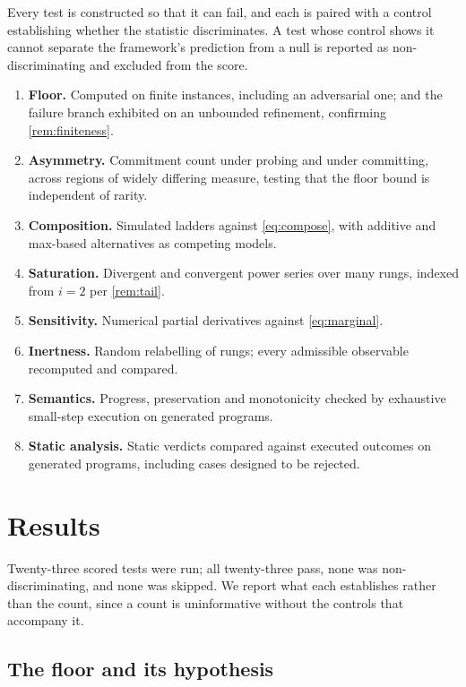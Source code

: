 \documentclass[11pt,twocolumn,a4paper]{article}
\theoremstyle{plain}
\theoremstyle{definition}
\theoremstyle{remark}
\begin{document}
Every test is constructed so that it can fail, and each is paired with a control
establishing whether the statistic discriminates. A test whose control shows it
cannot separate the framework's prediction from a null is reported as
non-discriminating and excluded from the score.

\begin{enumerate}[label=\textbf{V\arabic*.},leftmargin=3em,itemsep=0.4em]
\item \textbf{Floor.} Computed on finite instances, including an adversarial
one; and the failure branch exhibited on an unbounded refinement, confirming
\cref{rem:finiteness}.
\item \textbf{Asymmetry.} Commitment count under probing and under committing,
across regions of widely differing measure, testing that the floor bound is
independent of rarity.
\item \textbf{Composition.} Simulated ladders against \cref{eq:compose}, with
additive and max-based alternatives as competing models.
\item \textbf{Saturation.} Divergent and convergent power series over many
rungs, indexed from $i=2$ per \cref{rem:tail}.
\item \textbf{Sensitivity.} Numerical partial derivatives against
\cref{eq:marginal}.
\item \textbf{Inertness.} Random relabelling of rungs; every admissible
observable recomputed and compared.
\item \textbf{Semantics.} Progress, preservation and monotonicity checked by
exhaustive small-step execution on generated programs.
\item \textbf{Static analysis.} Static verdicts compared against executed
outcomes on generated programs, including cases designed to be rejected.
\end{enumerate}

\section{Results}
\label{sec:results}

Twenty-three scored tests were run; all twenty-three pass, none was
non-discriminating, and none was skipped. We report what each establishes
rather than the count, since a count is uninformative without the controls that
accompany it.

\subsection{The floor and its hypothesis}
\end{document}
